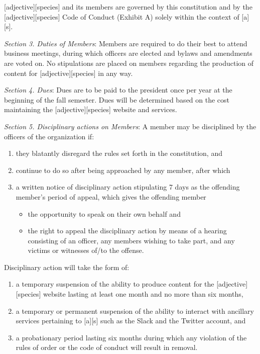 \documentclass{article}
\begin{document}
[adjective][species] and its members are governed by this constitution and by the [adjective][species] Code of Conduct (Exhibit A) solely within the context of [a][s].

\emph{Section 3. Duties of Members}: Members are required to do their best to attend business meetings, during which officers are elected and bylaws and amendments are voted on.  No stipulations are placed on members regarding the production of content for [adjective][species] in any way.

\emph{Section 4. Dues}: Dues are to be paid to the president once per year at the beginning of the fall semester.  Dues will be determined based on the cost maintaining the [adjective][species] website and services.

\emph{Section 5. Disciplinary actions on Members}: A member may be disciplined by the officers of the organization if:
\begin{enumerate}
  \item they blatantly disregard the rules set forth in the constitution, and
  \item continue to do so after being approached by any member, after which
  \item a written notice of disciplinary action stipulating 7 days as the offending member's period of appeal, which gives the offending member
  \begin{itemize}
    \item the opportunity to speak on their own behalf and
    \item the right to appeal the disciplinary action by means of a hearing consisting of an officer, any members wishing to take part, and any victims or witnesses of/to the offense.
  \end{itemize}
\end{enumerate}

Disciplinary action will take the form of:
\begin{enumerate}
  \item a temporary suspension of the ability to produce content for the [adjective][species] website lasting at least one month and no more than six months,
  \item a temporary or permanent suspension of the ability to interact with ancillary services pertaining to [a][s] such as the Slack and the Twitter account, and
  \item a probationary period lasting six months during which any violation of the rules of order or the code of conduct will result in removal.
\end{enumerate}
\end{document}
